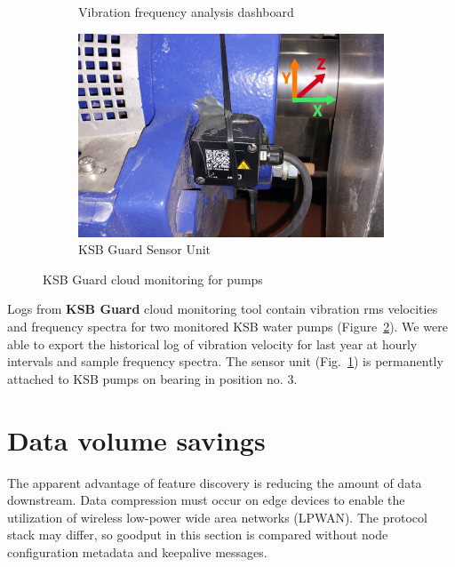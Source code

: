 \begin{figure}[h]
\begin{subfigure}[b]{0.49\textwidth}
        \caption{Vibration frequency analysis dashboard}
    \end{subfigure}
    \hfill
    \begin{subfigure}[b]{0.49\textwidth}
    		\centering
        \includegraphics[width=\textwidth]{assets/design/sensor/ksb-cloud.jpg}
        \caption{KSB Guard Sensor Unit}
        \label{fig:design:ksb-device}
    \end{subfigure}
     \caption{KSB Guard cloud monitoring for pumps}
     \label{fig:design:ksb-guard}
\end{figure}

Logs from \textbf{KSB Guard} cloud monitoring tool contain vibration rms velocities and frequency spectra for two monitored KSB water pumps (Figure~\ref{fig:design:ksb-guard}). We were able to export the historical log of vibration velocity for last year at hourly intervals and sample frequency spectra. The sensor unit (Fig.~\ref{fig:design:ksb-device}) is permanently attached to KSB pumps on bearing in position no. 3.

\section{Data volume savings}
The apparent advantage of feature discovery is reducing the amount of data downstream. Data compression must occur on edge devices to enable the utilization of wireless low-power wide area networks (LPWAN). The protocol stack may differ, so goodput in this section is compared without node configuration metadata and keepalive messages. 

